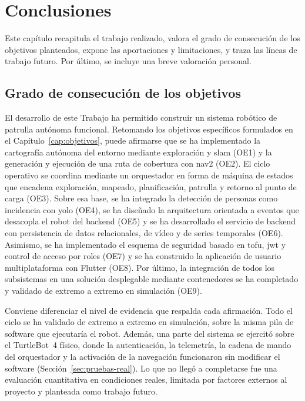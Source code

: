 \chapter{Conclusiones}
\label{cap:conclusiones}

Este capítulo recapitula el trabajo realizado, valora el grado de consecución de los
objetivos planteados, expone las aportaciones y limitaciones, y traza las líneas de trabajo
futuro. Por último, se incluye una breve valoración personal.

\section{Grado de consecución de los objetivos}
\label{sec:consecucion-objetivos}

El desarrollo de este Trabajo ha permitido construir un sistema robótico de
patrulla autónoma funcional. Retomando los objetivos específicos formulados en
el Capítulo~\ref{cap:objetivos}, puede afirmarse que se ha implementado la cartografía
autónoma del entorno mediante exploración y \gls{slam} (OE1) y la generación y ejecución de
una ruta de cobertura con \gls{nav2} (OE2). El ciclo operativo se coordina mediante un
orquestador en forma de máquina de estados que encadena exploración, mapeado, planificación,
patrulla y retorno al punto de carga (OE3). Sobre esa base, se ha integrado la detección de
personas como incidencia con \gls{yolo} (OE4), se ha diseñado la arquitectura orientada a
eventos que desacopla el robot del backend (OE5) y se ha desarrollado el servicio de backend
con persistencia de datos relacionales, de vídeo y de series temporales (OE6). Asimismo, se
ha implementado el esquema de seguridad basado en \gls{tofu}, \gls{jwt} y control de acceso
por roles (OE7) y se ha construido la aplicación de usuario multiplataforma con
\mbox{Flutter} (OE8). Por último, la integración de todos los subsistemas en una solución
desplegable mediante contenedores se ha completado y validado de extremo a extremo en
simulación (OE9).

Conviene diferenciar el nivel de evidencia que respalda cada afirmación. Todo el ciclo se ha
validado de extremo a extremo en simulación, sobre la misma pila de software que ejecutaría el
robot. Además, una parte del sistema se ejercitó sobre el \mbox{TurtleBot~4} físico, donde la
autenticación, la telemetría, la cadena de mando del orquestador y la activación de la navegación
funcionaron sin modificar el software (Sección~\ref{sec:pruebas-real}). Lo que no llegó a
completarse fue una evaluación cuantitativa en condiciones reales, limitada por factores externos
al proyecto y planteada como trabajo futuro.
